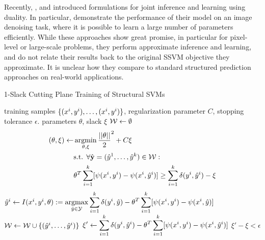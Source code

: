 Recently, \citet{meshi2010learning}, \citet{hazan2010primal} and
\citet{komodakis2011efficient} introduced formulations for joint inference and
learning using duality.
In particular, \citet{hazan2010primal} demonstrate the performance of their
model on an image denoising task, where it is possible to learn a large number
of parameters efficiently.
While these approaches show great promise, in particular for pixel-level or
large-scale problems, they perform approximate inference and learning, and do
not relate their results back to the original SSVM objective they approximate.
It is unclear how they compare to standard structured prediction approaches
on real-world applications.

\begin{algorithm*}[t]
    \caption{1-Slack Cutting Plane Training of Structural SVMs \label{alg_one_slack_again}}
    \begin{algorithmic}[1]
        \Require training samples $\{ (x^{i}, y^{i}), \dots, (x^{i}, y^{i})\}$, regularization parameter $C$, stopping tolerance $\epsilon$.
        \Ensure parameters $\theta$, slack $\xi$
        \State $\mathcal{W} \leftarrow \emptyset$
        \Repeat
            \State \label{line_restricted}
            \vspace{-5mm}
            \begin{align*}
                (\theta, \xi) \leftarrow \displaystyle &\operatorname*{argmin}_{\theta, \xi} \frac{||\theta||}{2}^2 + C \xi\\
            &\text{s.t. }\forall \hat{\mathbf{y}}=(\hat{y}^{1}, \dots, \hat{y}^{k}) \in \mathcal{W}:\\
            &\theta^T \sum_{i=1}^k [\psi(x^{i}, y^{i}) - \psi(x^{i}, \hat{y}^{i})] \geq \sum_{i=1}^k \delta(y^{i}, \hat{y}^{i}) - \xi
            \end{align*}
                \State
                $\hat{y}^{i} \leftarrow I(x^{i}, y^{i}, \theta) := \displaystyle \operatorname*{argmax}_{\hat{y}\in\mathcal{Y}} \sum_{i=1}^k \delta(y^{i}, \hat{y}) - \theta^T \sum_{i=1}^k [\psi(x^{i}, y^{i}) - \psi(x^{i}, \hat{y})]$ \label{get_cutting_plane_again}
            \EndFor
            \State $\mathcal{W} \leftarrow \mathcal{W} \cup \{ (\hat{y}^{i}, \dots, \hat{y}^{i}) \} $
            \State $ \displaystyle \xi' \leftarrow  \sum_{i=1}^k \delta(y^{i}, \hat{y}^{i}) - \theta^T \sum_{i=1}^k [\psi(x^{i}, y^{i}) - \psi(x^{i}, \hat{y}^{i})] $
        \Until $\xi' - \xi < \epsilon$ \label{convergence_check}
    \end{algorithmic}
\end{algorithm*}

